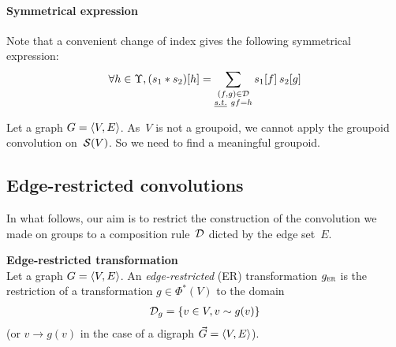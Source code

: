 \paragraph{Symmetrical expression}
Note that a convenient change of index gives the following symmetrical expression:
\begin{gather*}
\forall h \in \Upsilon, (s_1 \ast s_2) [h] = \displaystyle\sum_{\substack{(f,g) \in \cd\\ \st gf=h}} s_1[f] \h{2} s_2[g]
\end{gather*}

Let a graph $\gve$. As~$V$ is not a groupoid, we cannot apply the groupoid convolution on~$\cs(V)$. So we need to find a meaningful groupoid.





\subsection{Edge-restricted convolutions}

In what follows, our aim is to restrict the construction of the convolution we made on groups to a composition rule~$\cd$ dicted by the edge set~$E$.

\begin{definition}\textbf{Edge-restricted transformation}\\
Let a graph $\gve$. An \emph{edge-restricted} (ER) transformation $g_{\ER}$ is the restriction of a transformation $g \in \Phi^*(V)$ to the domain
\begin{gather*}
\cd_g = \{v \in V, v \sim g(v)\}
\end{gather*}
(or $v \rightarrow g(v)$ in the case of a digraph $\vgve$).
\end{definition}

